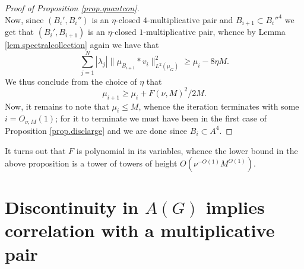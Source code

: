 \documentclass[12pt]{amsart}
\numberwithin{equation}{section}
\theoremstyle{plain}
\theoremstyle{definition}
\renewcommand{\leq}{\leqslant}
\renewcommand{\geq}{\geqslant}
\begin{document}
\begin{proof}[Proof of Proposition \ref{prop.quantcon}]
\begin{equation*}
\end{equation*}
Now, since $(B_i',B_{i}'')$ is an $\eta$-closed $4$-multiplicative pair and $B_{i+1} \subset B_i''^4$ we get that $(B_i',B_{i+1})$ is an $\eta$-closed $1$-multiplicative pair, whence by Lemma \ref{lem.spectralcollection} again we have that
\begin{equation*}
\sum_{j=1}^N{|\lambda_j|\|\mu_{B_{i+1}} \ast v_i\|_{L^2(\mu_G)}^2} \geq \mu_i - 8\eta M.
\end{equation*}
We thus conclude from the choice of $\eta$ that
\begin{equation*}
\mu_{i+1} \geq \mu_i + F(\nu,M)^2/2M.
\end{equation*}
Now, it remains to note that $\mu_i \leq M$, whence the iteration terminates with some $i = O_{\nu,M}(1)$; for it to terminate we must have been in the first case of Proposition \ref{prop.disclarge} and we are done since $B_i \subset A^4$.
\end{proof}
It turns out that $F$ is polynomial in its variables, whence the lower bound in the above proposition is a tower of towers of height $O(\nu^{-O(1)}M^{O(1)})$.

\section{Discontinuity in $A(G)$ implies correlation with a multiplicative pair}\label{sec.dis}
 
\end{document}
